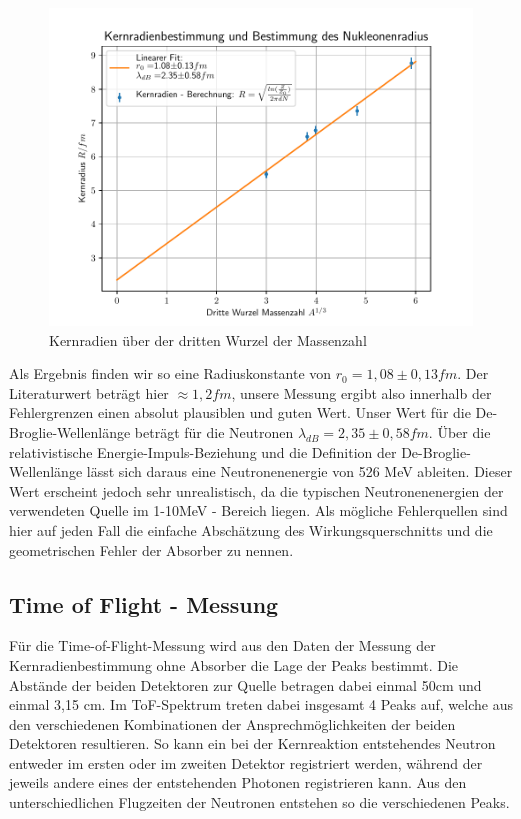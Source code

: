 \begin{figure}[htbp]  
     \includegraphics{kernradien.pdf}
  \caption{Kernradien über der dritten Wurzel der Massenzahl}
  \label{kernradien}
\end{figure}

Als Ergebnis finden wir so eine Radiuskonstante von $r_0=1,08 \pm 0,13 fm$. Der Literaturwert beträgt hier $\approx 1,2 fm$, unsere Messung ergibt also innerhalb der Fehlergrenzen einen absolut plausiblen und guten Wert. Unser Wert für die De-Broglie-Wellenlänge beträgt für die Neutronen $\lambda_{dB}=2,35 \pm 0,58 fm$. Über die relativistische Energie-Impuls-Beziehung und die Definition der De-Broglie-Wellenlänge lässt sich daraus eine Neutronenenergie von 526 MeV ableiten. Dieser Wert erscheint jedoch sehr unrealistisch, da die typischen Neutronenenergien der verwendeten Quelle im 1-10MeV - Bereich liegen. Als mögliche Fehlerquellen sind hier auf jeden Fall die einfache Abschätzung des Wirkungsquerschnitts und die geometrischen Fehler der Absorber zu nennen.

\subsection{Time of Flight - Messung}

Für die Time-of-Flight-Messung wird aus den Daten der Messung der Kernradienbestimmung ohne Absorber die Lage der Peaks bestimmt. Die Abstände der beiden Detektoren zur Quelle betragen dabei einmal 50cm und einmal 3,15 cm. Im ToF-Spektrum treten dabei insgesamt 4 Peaks auf, welche aus den verschiedenen Kombinationen der Ansprechmöglichkeiten der beiden Detektoren resultieren. So kann ein bei der Kernreaktion entstehendes Neutron entweder im ersten oder im zweiten Detektor registriert werden, während der jeweils andere eines der entstehenden Photonen registrieren kann. Aus den unterschiedlichen Flugzeiten der Neutronen entstehen so die verschiedenen Peaks.

